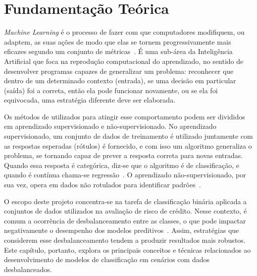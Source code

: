 \chapter{Fundamentação Teórica}\label{cap:fundamentacaoTeorica}



\textit{Machine Learning} é o processo de fazer com que computadores modifiquem, ou adaptem, as suas ações de modo que elas se tornem progressivamente mais eficazes segundo um conjunto de métricas~\cite{StephenMarsland2014}. É uma sub-área da Inteligência Artificial que foca na reprodução computacional do aprendizado, no sentido de desenvolver programas capazes de generalizar um problema: reconhecer que dentro de um determinado contexto (entrada), se uma decisão em particular (saída) foi a correta, então ela pode funcionar novamente, ou se ela foi equivocada, uma estratégia diferente deve ser elaborada.

Os métodos de utilizados para atingir esse comportamento podem ser divididos em aprendizado supervisionado e não-supervisionado. No aprendizado supervisionado, um conjunto de dados de treinamento é utilizado juntamente com as respostas esperadas (rótulos) é fornecido, e com isso um algoritmo generaliza o problema, se tornando capaz de prever a resposta correta para novas entradas. Quando essa resposta é categórica, diz-se que o algoritmo é de classificação, e quando é contínua chama-se regressão~\cite{SindhuMeena2020}. O aprendizado não-supervisionado, por sua vez, opera em dados não rotulados para identificar padrões~\cite{Dike2018}.

O escopo deste projeto concentra-se na tarefa de classificação binária aplicada a conjuntos de dados utilizados na avaliação de risco de crédito. Nesse contexto, é comum a ocorrência de desbalanceamento entre as classes, o que pode impactar negativamente o desempenho dos modelos preditivos~\cite{Namvar2018}. Assim, estratégias que considerem esse desbalanceamento tendem a produzir resultados mais robustos. Este capítulo, portanto, explora os principais conceitos e técnicas relacionados ao desenvolvimento de modelos de classificação em cenários com dados desbalanceados.

